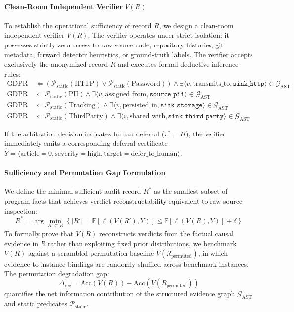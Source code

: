 \paragraph{Clean-Room Independent Verifier $V(R)$}
To establish the operational sufficiency of record $R$, we design a clean-room independent verifier $V(R)$. The verifier operates under strict isolation: it possesses strictly zero access to raw source code, repository histories, git metadata, forward detector heuristics, or ground-truth labels. The verifier accepts exclusively the anonymized record $R$ and executes formal deductive inference rules:
\begin{align}
\text{GDPR Art.~32} &\Longleftarrow \left( \mathcal{P}_{\text{static}}(\text{HTTP}) \vee \mathcal{P}_{\text{static}}(\text{Password}) \right) \wedge \exists \langle v, \text{transmits\_to}, \texttt{sink\_http} \rangle \in \mathcal{G}_{\text{AST}} \\
\text{GDPR Art.~5} &\Longleftarrow \mathcal{P}_{\text{static}}(\text{PII}) \wedge \exists \langle v, \text{assigned\_from}, \texttt{source\_pii} \rangle \in \mathcal{G}_{\text{AST}} \\
\text{GDPR Art.~25} &\Longleftarrow \mathcal{P}_{\text{static}}(\text{Tracking}) \wedge \exists \langle v, \text{persisted\_in}, \texttt{sink\_storage} \rangle \in \mathcal{G}_{\text{AST}} \\
\text{GDPR Art.~6} &\Longleftarrow \mathcal{P}_{\text{static}}(\text{ThirdParty}) \wedge \exists \langle v, \text{shared\_with}, \texttt{sink\_third\_party} \rangle \in \mathcal{G}_{\text{AST}}
\end{align}

If the arbitration decision indicates human deferral ($\pi^* = H$), the verifier immediately emits a corresponding deferral certificate $\hat{Y} = \langle \text{article}=0, \text{severity}=\text{high}, \text{target}=\text{defer\_to\_human} \rangle$.

\paragraph{Sufficiency and Permutation Gap Formulation}
We define the minimal sufficient audit record $R^*$ as the smallest subset of program facts that achieves verdict reconstructability equivalent to raw source inspection:
\begin{equation}
R^* = \arg\min_{R' \subseteq R} \left\{ |R'| \;\middle|\; \mathbb{E}\left[ \ell(V(R'), Y) \right] \le \mathbb{E}\left[ \ell(V(R), Y) \right] + \delta \right\}
\end{equation}
To formally prove that $V(R)$ reconstructs verdicts from the factual causal evidence in $R$ rather than exploiting fixed prior distributions, we benchmark $V(R)$ against a scrambled permutation baseline $V(R_{\text{permuted}})$, in which evidence-to-instance bindings are randomly shuffled across benchmark instances. The permutation degradation gap:
\begin{equation}
\Delta_{\text{rec}} = \text{Acc}(V(R)) - \text{Acc}(V(R_{\text{permuted}}))
\end{equation}
quantifies the net information contribution of the structured evidence graph $\mathcal{G}_{\text{AST}}$ and static predicates $\mathcal{P}_{\text{static}}$.
